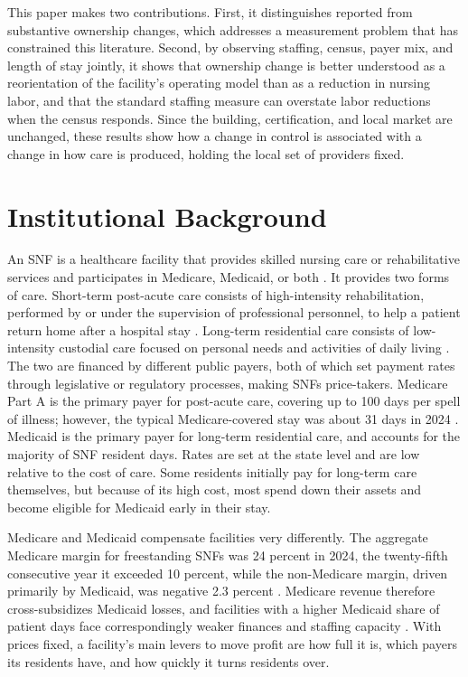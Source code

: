 \documentclass[12pt]{article}
\begin{document}
This paper makes two contributions. First, it distinguishes reported from substantive ownership changes, which addresses a measurement problem that has constrained this literature. Second, by observing staffing, census, payer mix, and length of stay jointly, it shows that ownership change is better understood as a reorientation of the facility's operating model than as a reduction in nursing labor, and that the standard staffing measure can overstate labor reductions when the census responds. Since the building, certification, and local market are unchanged, these results show how a change in control is associated with a change in how care is produced, holding the local set of providers fixed.

\section{Institutional Background} \label{sec:background}

An SNF is a healthcare facility that provides skilled nursing care or rehabilitative services and participates in Medicare, Medicaid, or both \citep{eCFR42CFR476.1}. It provides two forms of care. Short-term post-acute care consists of high-intensity rehabilitation, performed by or under the supervision of professional personnel, to help a patient return home after a hospital stay \citep{CMSBenefitManualCh8}. Long-term residential care consists of low-intensity custodial care focused on personal needs and activities of daily living \citep{CMSBenefitManualCh16}. The two are financed by different public payers, both of which set payment rates through legislative or regulatory processes, making SNFs price-takers. Medicare Part A is the primary payer for post-acute care, covering up to 100 days per spell of illness; however, the typical Medicare-covered stay was about 31 days in 2024 \citep{MedPAC2026Report}. Medicaid is the primary payer for long-term residential care, and accounts for the majority of SNF resident days. Rates are set at the state level and are low relative to the cost of care. Some residents initially pay for long-term care themselves, but because of its high cost, most spend down their assets and become eligible for Medicaid early in their stay.

Medicare and Medicaid compensate facilities very differently. The aggregate Medicare margin for freestanding SNFs was 24 percent in 2024, the twenty-fifth consecutive year it exceeded 10 percent, while the non-Medicare margin, driven primarily by Medicaid, was negative 2.3 percent \citep{MedPAC2026Report}. Medicare revenue therefore cross-subsidizes Medicaid losses, and facilities with a higher Medicaid share of patient days face correspondingly weaker finances and staffing capacity \citep{bowblis_brunt_2025}. With prices fixed, a facility's main levers to move profit are how full it is, which payers its residents have, and how quickly it turns residents over.
\end{document}
